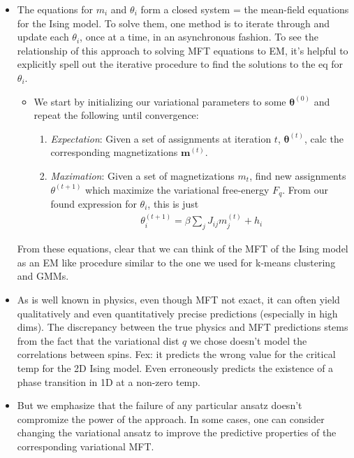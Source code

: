 \documentclass[norsk,a4paper,11pt]{article}
\begin{document}
\begin{itemize}
	\item The equations for $m_i$ and $\theta_i$ form a closed system = the mean-field equations for the Ising model. To solve them, one method is to iterate through and update each $\theta_i$, once at a time, in an asynchronous fashion. To see the relationship of this approach to solving MFT equations to EM, it's helpful to explicitly spell out the iterative procedure to find the solutions to the eq for $\theta_i$. 
	\begin{itemize}
		\item We start by initializing our variational parameters to some $\bm{\theta}^{(0)}$ and repeat the following until convergence:
		\begin{enumerate}
			\item \textit{Expectation}: 
			Given a set of assignments at iteration $t$, $\bm{\theta}^{(t)}$, calc the corresponding magnetizations $\bm{m}^{(t)}$.
			\item \textit{Maximation}:
			Given a set of magnetizations $m_t$, find new assignments $\theta^{(t+1)}$ which maximize the variational free-energy $F_q$. From our found expression for $\theta_i$, this is just
			\begin{align}
				\theta_i^{(t+1)} = \beta \sum_j J_{ij} m_j^{(t)} + h_i
			\end{align}
		\end{enumerate}
	\end{itemize}
	From these equations, clear that we can think of the MFT of the Ising model as an EM like procedure similar to the one we used for k-means clustering and GMMs.
	\item As is well known in physics, even though MFT not exact, it can often yield qualitatively and even quantitatively precise predictions (especially in high dims). The discrepancy between the true physics and MFT predictions stems from the fact that the variational dist $q$ we chose doesn't model the correlations between spins. Fex: it predicts the wrong value for the critical temp for the 2D Ising model. Even erroneously predicts the existence of a phase transition in 1D at a non-zero temp. 
	\item But we emphasize that the failure of any particular ansatz doesn't compromize the power of the approach. In some cases, one can consider changing the variational ansatz to improve the predictive properties of the corresponding variational MFT.
\end{itemize}
\end{document}
